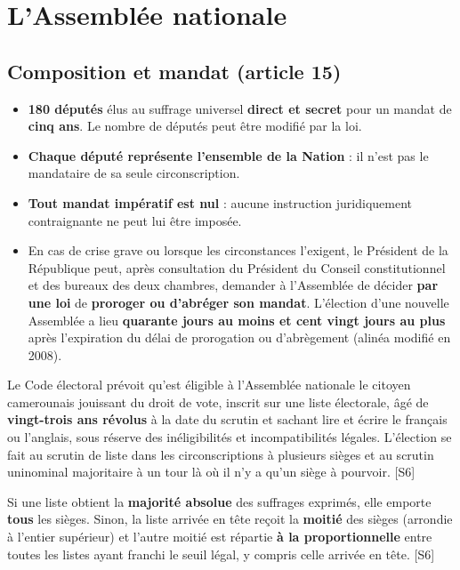 \documentclass[11pt,a4paper,oneside]{report}
\newcommand{\src}[1]{\textcolor{bluec}{\scriptsize[#1]}}
\begin{document}
\chapter{L'Assemblée nationale}
\section{Composition et mandat (article 15)}
\begin{itemize}
  \item \textbf{180 députés} élus au suffrage universel \textbf{direct et secret} pour un mandat de \textbf{cinq ans}. Le nombre de députés peut être modifié par la loi.
  \item \textbf{Chaque député représente l'ensemble de la Nation} : il n'est pas le mandataire de sa seule circonscription.
  \item \textbf{Tout mandat impératif est nul} : aucune instruction juridiquement contraignante ne peut lui être imposée.
  \item En cas de crise grave ou lorsque les circonstances l'exigent, le Président de la République peut, après consultation du Président du Conseil constitutionnel et des bureaux des deux chambres, demander à l'Assemblée de décider \textbf{par une loi} de \textbf{proroger ou d'abréger son mandat}. L'élection d'une nouvelle Assemblée a lieu \textbf{quarante jours au moins et cent vingt jours au plus} après l'expiration du délai de prorogation ou d'abrègement (alinéa modifié en 2008).
\end{itemize}
Le Code électoral prévoit qu'est éligible à l'Assemblée nationale le citoyen camerounais jouissant du droit de vote, inscrit sur une liste électorale, âgé de \textbf{vingt-trois ans révolus} à la date du scrutin et sachant lire et écrire le français ou l'anglais, sous réserve des inéligibilités et incompatibilités légales. L'élection se fait au scrutin de liste dans les circonscriptions à plusieurs sièges et au scrutin uninominal majoritaire à un tour là où il n'y a qu'un siège à pourvoir. \src{S6}

\begin{defbox}[title={Définition — Le système mixte des circonscriptions plurinominales}]
Si une liste obtient la \textbf{majorité absolue} des suffrages exprimés, elle emporte \textbf{tous} les sièges. Sinon, la liste arrivée en tête reçoit la \textbf{moitié} des sièges (arrondie à l'entier supérieur) et l'autre moitié est répartie \textbf{à la proportionnelle} entre toutes les listes ayant franchi le seuil légal, y compris celle arrivée en tête. \src{S6}
\end{defbox}
\end{document}
